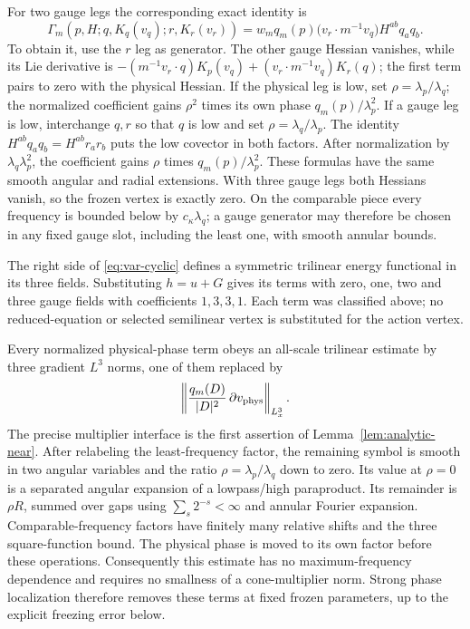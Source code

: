 \documentclass[11pt,a4paper]{article}
\numberwithin{equation}{section}
\newcommand{\f}[2]{\frac{#1}{#2}}
\theoremstyle{definition}
\begin{document}
For two gauge legs the corresponding exact identity is
\begin{equation*}
\Gamma_m(p,H;q,K_q(v_q);r,K_r(v_r))
=w_mq_m(p)\bigl(v_r\cdot m^{-1}v_q\bigr)H^{ab}q_aq_b.
\end{equation*}
To obtain it, use the $r$ leg as generator. The other gauge Hessian
vanishes, while its Lie derivative is
$-(m^{-1}v_r\cdot q)K_p(v_q)
 +(v_r\cdot m^{-1}v_q)K_r(q)$; the first term pairs to zero with
the physical Hessian. If the physical leg is low, set
$\rho=\lambda_p/\lambda_q$; the normalized coefficient gains
$\rho^2$ times its own phase $q_m(p)/\lambda_p^2$.
If a gauge leg is low, interchange $q,r$ so that $q$ is low and set
$\rho=\lambda_q/\lambda_p$. The identity
$H^{ab}q_aq_b=H^{ab}r_ar_b$ puts the low covector in both factors.
After normalization by $\lambda_q\lambda_p^2$, the coefficient gains
$\rho$ times $q_m(p)/\lambda_p^2$. These formulas have
the same smooth angular and radial extensions. With three gauge
legs both Hessians vanish, so the frozen vertex is exactly zero.
On the comparable piece every frequency is bounded below by
$c_\kappa \lambda_q$; a gauge generator may therefore be chosen in any fixed
gauge slot, including the least one, with smooth annular bounds.

The right side of \eqref{eq:var-cyclic} defines a symmetric trilinear
energy functional in its three fields. Substituting $h=u+G$ gives its
terms with zero, one, two and three gauge fields with coefficients
$1,3,3,1$. Each term was classified above; no reduced-equation or
selected semilinear vertex is substituted for the action vertex.

Every normalized physical-phase term obeys an all-scale trilinear
estimate by three gradient $L^3$ norms, one of them replaced by
\begin{equation*}
\left\|\f{q_m(D)}{|D|^2}\,\partial v_{\rm phys}\right\|_{L^3_x}.
\end{equation*}
The precise multiplier interface is the first assertion of
Lemma~\ref{lem:analytic-near}.
After relabeling the least-frequency factor, the remaining symbol is
smooth in two angular variables and the ratio $\rho=\lambda_p/\lambda_q$ down to zero.
Its value at $\rho=0$ is a separated angular expansion of a lowpass/high
paraproduct. Its remainder is $\rho R$, summed over gaps using
$\sum_s2^{-s}<\infty$ and annular Fourier expansion. Comparable-frequency factors
have finitely many relative shifts and the three square-function bound.
The physical phase is moved to its own factor before these operations.
Consequently this estimate has no maximum-frequency dependence and
requires no smallness of a cone-multiplier norm. Strong phase localization
therefore removes these terms at fixed frozen parameters, up to the
explicit freezing error below.
\end{document}
